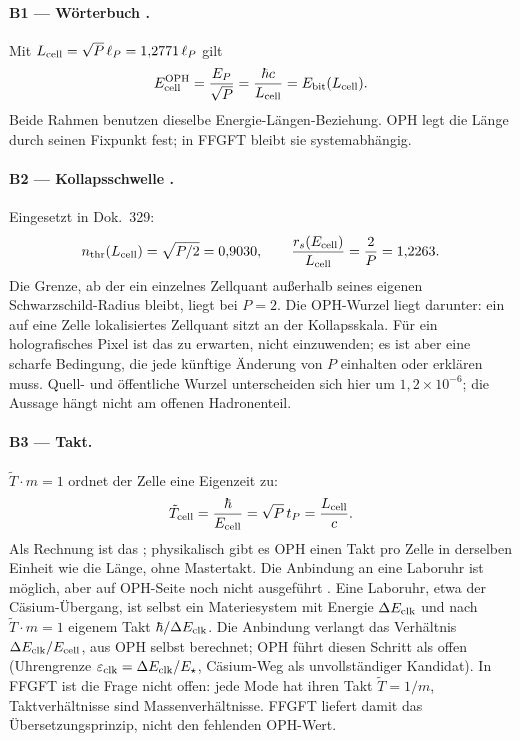 \paragraph{B1 --- Wörterbuch \BM.} Mit $L_{\rm cell}=\sqrt P\,\ell_P=1{,}2771\,\ell_P$ gilt
\begin{equation}
  E_{\rm cell}^{\rm OPH}=\frac{E_P}{\sqrt P}=\frac{\hbar c}{L_{\rm cell}}=E_{\rm bit}(L_{\rm cell}).
\end{equation}
Beide Rahmen benutzen dieselbe Energie-Längen-Beziehung. OPH legt die Länge
durch seinen Fixpunkt fest; in FFGFT bleibt sie systemabhängig.

\paragraph{B2 --- Kollapsschwelle \BM.} Eingesetzt in Dok.~329:
\begin{equation}
  n_{\rm thr}(L_{\rm cell})=\sqrt{P/2}=0{,}9030,\qquad
  \frac{r_s(E_{\rm cell})}{L_{\rm cell}}=\frac2P=1{,}2263 .
\end{equation}
Die Grenze, ab der ein einzelnes Zellquant außerhalb seines eigenen
Schwarzschild-Radius bleibt, liegt bei $P=2$. Die OPH-Wurzel liegt darunter:
ein auf eine Zelle lokalisiertes Zellquant sitzt an der Kollapsskala. Für ein
holografisches Pixel ist das zu erwarten, nicht einzuwenden; es ist aber eine
scharfe Bedingung, die jede künftige Änderung von $P$ einhalten oder erklären
muss. Quell- und öffentliche Wurzel unterscheiden sich hier um
$1{,}2\times10^{-6}$; die Aussage hängt nicht am offenen Hadronenteil.

\paragraph{B3 --- Takt.} $\tilde T\cdot m=1$ ordnet der Zelle eine Eigenzeit zu:
\begin{equation}
  \tilde T_{\rm cell}=\frac{\hbar}{E_{\rm cell}}=\sqrt P\,t_P=\frac{L_{\rm cell}}{c}.
\end{equation}
Als Rechnung ist das \BM; physikalisch gibt es OPH einen Takt pro Zelle in
derselben Einheit wie die Länge, ohne Mastertakt. Die Anbindung an eine
Laboruhr ist möglich, aber auf OPH-Seite noch nicht ausgeführt \SM. Eine
Laboruhr, etwa der Cäsium-Übergang, ist selbst ein Materiesystem mit Energie
$\Delta E_{\rm clk}$ und nach $\tilde T\cdot m=1$ eigenem Takt $\hbar/\Delta E_{\rm clk}$.
Die Anbindung verlangt das Verhältnis $\Delta E_{\rm clk}/E_{\rm cell}$, aus OPH
selbst berechnet; OPH führt diesen Schritt als offen (Uhrengrenze
$\varepsilon_{\rm clk}=\Delta E_{\rm clk}/E_\star$, Cäsium-Weg als unvollständiger
Kandidat). In FFGFT ist die Frage nicht offen: jede Mode hat ihren Takt
$\tilde T=1/m$, Taktverhältnisse sind Massenverhältnisse. FFGFT liefert damit
das Übersetzungsprinzip, nicht den fehlenden OPH-Wert.

